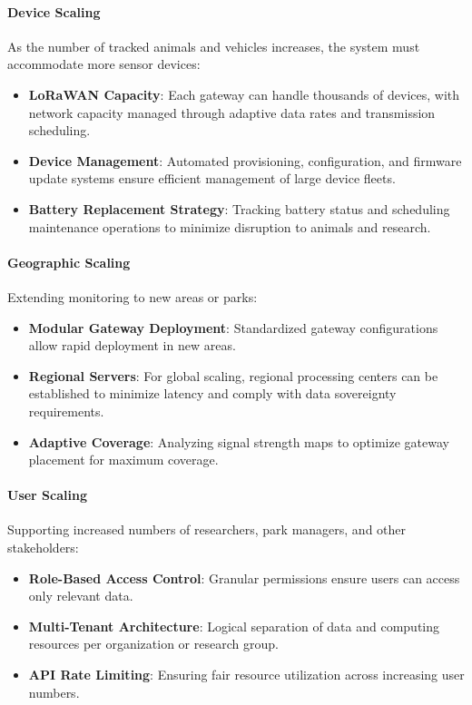 \paragraph{Device Scaling}
As the number of tracked animals and vehicles increases, the system must accommodate more sensor devices:

\begin{itemize}
  \item \textbf{LoRaWAN Capacity}: Each gateway can handle thousands of devices, with network capacity managed through adaptive data rates and transmission scheduling.
  \item \textbf{Device Management}: Automated provisioning, configuration, and firmware update systems ensure efficient management of large device fleets.
  \item \textbf{Battery Replacement Strategy}: Tracking battery status and scheduling maintenance operations to minimize disruption to animals and research.
\end{itemize}

\paragraph{Geographic Scaling}
Extending monitoring to new areas or parks:

\begin{itemize}
  \item \textbf{Modular Gateway Deployment}: Standardized gateway configurations allow rapid deployment in new areas.
  \item \textbf{Regional Servers}: For global scaling, regional processing centers can be established to minimize latency and comply with data sovereignty requirements.
  \item \textbf{Adaptive Coverage}: Analyzing signal strength maps to optimize gateway placement for maximum coverage.
\end{itemize}

\paragraph{User Scaling}
Supporting increased numbers of researchers, park managers, and other stakeholders:

\begin{itemize}
  \item \textbf{Role-Based Access Control}: Granular permissions ensure users can access only relevant data.
  \item \textbf{Multi-Tenant Architecture}: Logical separation of data and computing resources per organization or research group.
  \item \textbf{API Rate Limiting}: Ensuring fair resource utilization across increasing user numbers.
\end{itemize}

